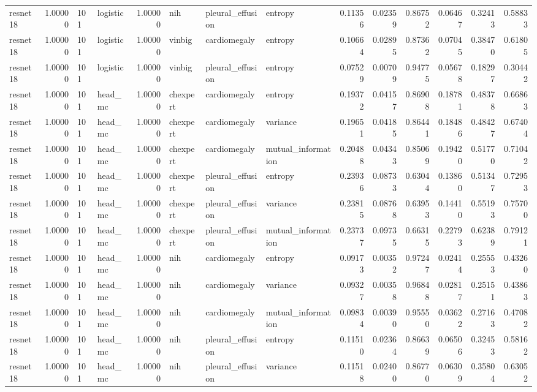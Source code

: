 \begin{tabular}{lrllrlllrrrrrr}
resnet18 & 1.00000 & 101 & logistic & 1.00000 & nih & pleural\_effusion & entropy & 0.11356 & 0.02359 & 0.86752 & 0.06467 & 0.32413 & 0.58833 \\
resnet18 & 1.00000 & 101 & logistic & 1.00000 & vinbig & cardiomegaly & entropy & 0.10664 & 0.02895 & 0.87362 & 0.07045 & 0.38470 & 0.61805 \\
resnet18 & 1.00000 & 101 & logistic & 1.00000 & vinbig & pleural\_effusion & entropy & 0.07529 & 0.00709 & 0.94775 & 0.05678 & 0.18297 & 0.30442 \\
resnet18 & 1.00000 & 101 & head\_mc & 1.00000 & chexpert & cardiomegaly & entropy & 0.19372 & 0.04157 & 0.86908 & 0.18781 & 0.48378 & 0.66863 \\
resnet18 & 1.00000 & 101 & head\_mc & 1.00000 & chexpert & cardiomegaly & variance & 0.19651 & 0.04185 & 0.86441 & 0.18486 & 0.48427 & 0.67404 \\
resnet18 & 1.00000 & 101 & head\_mc & 1.00000 & chexpert & cardiomegaly & mutual\_information & 0.20488 & 0.04343 & 0.85069 & 0.19420 & 0.51770 & 0.71042 \\
resnet18 & 1.00000 & 101 & head\_mc & 1.00000 & chexpert & pleural\_effusion & entropy & 0.23936 & 0.08733 & 0.63044 & 0.13860 & 0.51347 & 0.72953 \\
resnet18 & 1.00000 & 101 & head\_mc & 1.00000 & chexpert & pleural\_effusion & variance & 0.23815 & 0.08768 & 0.63953 & 0.14410 & 0.55193 & 0.75700 \\
resnet18 & 1.00000 & 101 & head\_mc & 1.00000 & chexpert & pleural\_effusion & mutual\_information & 0.23737 & 0.09735 & 0.66315 & 0.22793 & 0.62389 & 0.79121 \\
resnet18 & 1.00000 & 101 & head\_mc & 1.00000 & nih & cardiomegaly & entropy & 0.09173 & 0.00352 & 0.97247 & 0.02414 & 0.25553 & 0.43260 \\
resnet18 & 1.00000 & 101 & head\_mc & 1.00000 & nih & cardiomegaly & variance & 0.09327 & 0.00358 & 0.96848 & 0.02817 & 0.25151 & 0.43863 \\
resnet18 & 1.00000 & 101 & head\_mc & 1.00000 & nih & cardiomegaly & mutual\_information & 0.09834 & 0.00390 & 0.95550 & 0.03622 & 0.27163 & 0.47082 \\
resnet18 & 1.00000 & 101 & head\_mc & 1.00000 & nih & pleural\_effusion & entropy & 0.11510 & 0.02364 & 0.86639 & 0.06506 & 0.32453 & 0.58162 \\
resnet18 & 1.00000 & 101 & head\_mc & 1.00000 & nih & pleural\_effusion & variance & 0.11518 & 0.02400 & 0.86770 & 0.06309 & 0.35804 & 0.63052 \\

\end{tabular}
